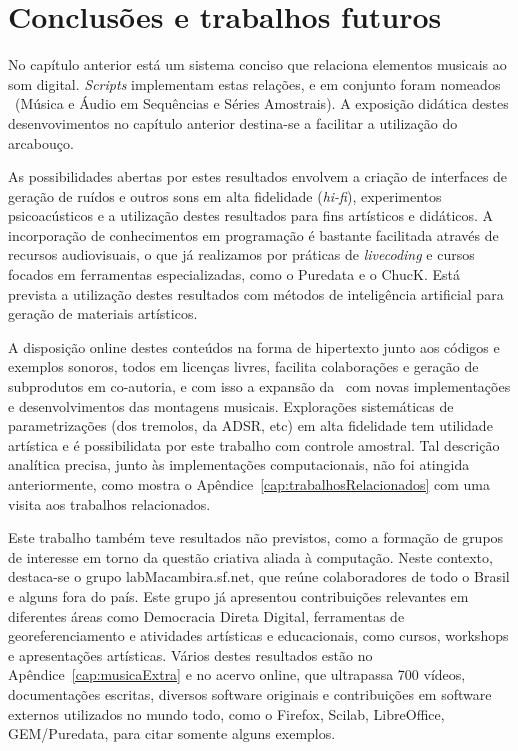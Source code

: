 \chapter{Conclusões e trabalhos futuros} %
\label{cap:conclusao}

No capítulo anterior está um sistema conciso
que relaciona elementos musicais ao som digital. \emph{Scripts} 
implementam estas relações, e em conjunto foram nomeados \massa\ (Música
e Áudio em Sequências e Séries Amostrais). 
A exposição didática destes desenvovimentos no
capítulo anterior destina-se a facilitar a utilização
do arcabouço.

As possibilidades abertas por estes resultados envolvem a criação de interfaces de geração de ruídos e outros sons em alta fidelidade (\emph{hi-fi}), experimentos psicoacústicos e a utilização destes resultados para fins artísticos e didáticos. A incorporação de conhecimentos
em programação é bastante facilitada através de recursos audiovisuais, o que já realizamos por práticas de \emph{livecoding} e cursos focados em ferramentas especializadas, como o Puredata e o ChucK.
Está prevista a utilização destes resultados com
métodos de inteligência artificial para geração de materiais artísticos.

A disposição online destes conteúdos na forma de hipertexto junto aos códigos e exemplos sonoros, todos em licenças livres, facilita colaborações e geração de subprodutos em co-autoria, e com isso a expansão da \massa\ com novas implementações e desenvolvimentos das montagens musicais.
Explorações sistemáticas de parametrizações (dos tremolos, da ADSR, etc) em alta fidelidade tem utilidade artística e é possibilidata por este trabalho com controle amostral. Tal descrição analítica precisa, junto às implementações computacionais, não foi atingida anteriormente, como mostra o Apêndice~\ref{cap:trabalhosRelacionados} com uma visita aos trabalhos relacionados.

Este trabalho também teve resultados não previstos, como a formação de grupos
de interesse em torno da questão criativa aliada à computação.
Neste contexto, destaca-se o grupo
labMacambira.sf.net, que reúne colaboradores de todo o Brasil e alguns fora do país.
Este grupo
já apresentou contribuições relevantes em diferentes áreas
como Democracia Direta Digital, ferramentas de georeferenciamento e
atividades artísticas e educacionais, como cursos, workshops e apresentações artísticas. Vários destes resultados estão no Apêndice~\ref{cap:musicaExtra} e no acervo online, que ultrapassa 700 vídeos, documentações escritas, diversos software originais e contribuições em software externos utilizados no mundo todo, como o Firefox, Scilab, LibreOffice, GEM/Puredata, para citar somente alguns exemplos.\cite{siteLM,wikiLM,vimeoLM}

